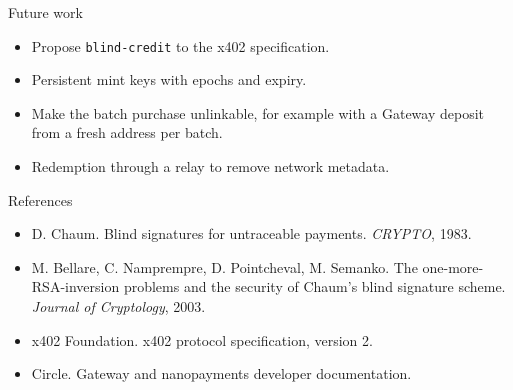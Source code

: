 \documentclass[aspectratio=169,11pt]{beamer}
\begin{document}
\begin{frame}{Future work}
  \begin{itemize}
    \item Propose \texttt{blind-credit} to the x402 specification.
    \item Persistent mint keys with epochs and expiry.
    \item Make the batch purchase unlinkable, for example with a Gateway deposit from a fresh address per batch.
    \item Redemption through a relay to remove network metadata.
  \end{itemize}
\end{frame}

\begin{frame}{References}
  \small
  \begin{itemize}
    \item D. Chaum. Blind signatures for untraceable payments. \emph{CRYPTO}, 1983.
    \item M. Bellare, C. Namprempre, D. Pointcheval, M. Semanko. The one-more-RSA-inversion problems and the security of Chaum's blind signature scheme. \emph{Journal of Cryptology}, 2003.
    \item x402 Foundation. x402 protocol specification, version 2.
    \item Circle. Gateway and nanopayments developer documentation.
  \end{itemize}
\end{frame}
\end{document}
